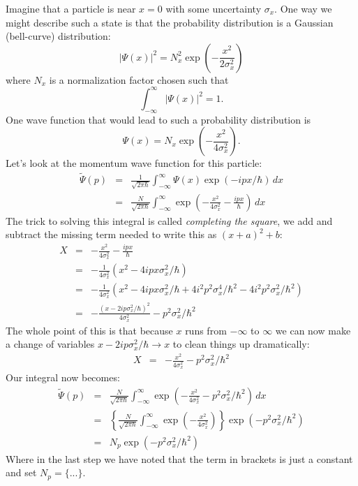 \documentclass[12pt]{article}
\begin{document}
Imagine that a particle is near $x=0$ with some uncertainty $\sigma_x$.  One way we might describe such a state is that the probability distribution is a Gaussian (bell-curve) distribution:
\begin{displaymath}
|\Psi(x)|^2 = N_x^2 \exp\left(-\frac{x^2}{2\sigma_x^2}\right)
\end{displaymath}
where $N_x$ is a normalization factor chosen such that 
\begin{displaymath}
\int_{-\infty}^{\infty} |\Psi(x)|^2 = 1.
\end{displaymath}
One wave function that would lead to such a probability distribution is 
\begin{displaymath}
\Psi(x) = N_x \exp\left(-\frac{x^2}{4\sigma_x^2}\right).
\end{displaymath}
Let's look at the momentum wave function for this particle:
\begin{eqnarray} 
\widetilde{\Psi}(p) &=&  \frac{1}{\sqrt{2\pi\hbar}} \int_{-\infty}^{\infty} {\Psi}(x) \exp(-ipx/\hbar) \, dx \\
&=&  \frac{N}{\sqrt{2\pi\hbar}} \int_{-\infty}^{\infty}  \exp \left(-\frac{x^2}{4\sigma_x^2} - \frac{ipx}{\hbar}\right) \, dx
\end{eqnarray}
The trick to solving this integral is called {\em completing the square}, we add and subtract the missing term needed to write this as $(x+a)^2 + b$:
\begin{eqnarray*} 
X &=&  -\frac{x^2}{4\sigma_x^2} - \frac{ipx}{\hbar} \\
&=&  -\frac{1}{4\sigma_x^2}(x^2 - 4ipx\sigma_x^2/\hbar) \\
&=&  -\frac{1}{4\sigma_x^2}(x^2 - 4ipx\sigma_x^2/\hbar  + 4i^2p^2\sigma_x^4/\hbar^2 - 4i^2p^2\sigma_x^2/\hbar^2) \\
&=&  -\frac{(x - 2 i p\sigma_x^2/\hbar)^2}{4\sigma_x^2} - p^2\sigma_x^2/\hbar^2
\end{eqnarray*}
The whole point of this is that because $x$ runs from $-\infty$ to $\infty$ we can now make a change of variables $x - 2 i p\sigma_x^2/\hbar \to x$ to clean things up dramatically:
\begin{eqnarray*} 
X &=&  -\frac{x^2}{4\sigma_x^2} - p^2\sigma_x^2/\hbar^2
\end{eqnarray*}
Our integral now becomes:
\begin{eqnarray} 
\widetilde{\Psi}(p) &=&  \frac{N}{\sqrt{2\pi\hbar}} \int_{-\infty}^{\infty}  \exp \left( -\frac{x^2}{4\sigma_x^2} - p^2\sigma_x^2/\hbar^2 \right) \, dx \nonumber \\
&=& \left\{ \frac{N}{\sqrt{2\pi\hbar}} \int_{-\infty}^{\infty}  \exp \left( -\frac{x^2}{4\sigma_x^2} \right) \right\} \exp\left( - p^2\sigma_x^2/\hbar^2 \right) \nonumber \\
&=& N_p \exp(-p^2 \sigma_x^2/\hbar^2) \label{eqn:psip}
\end{eqnarray}
Where in the last step we have noted that the term in brackets is just a constant and set $N_p=\{...\}$.
\end{document}
